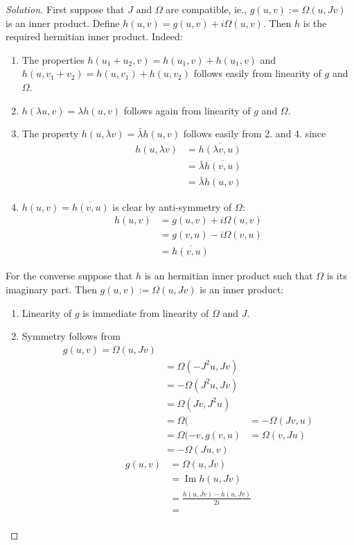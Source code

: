 \begin{proof}[Solution]\leavevmode
	First suppose that $J$ and $\Omega$ are compatible, ie., $g(u,v):=\Omega(u,Jv)$ is an inner product. Define $h(u,v)=g(u,v)+i\Omega(u,v)$. Then  $h$ is the required hermitian inner product. Indeed:

	\begin{enumerate}
		\item The properties $h(u_1+u_2,v)=h(u_1,v)+h(u_1,v)$ and  $h(u,v_1+v_2)=h(u,v_1)+h(u,v_2)$ follows easily from linearity of $g$ and $\Omega$.
		
		\item $h(\lambda u,v)=\lambda h(u,v)$ follows again from linearity of $g$ and $\Omega$.

		\item The property $h(u,\lambda v)=\bar{\lambda} h(u,v)$ follows easily from 2. and 4. since 
			\begin{align*}
				h(u,\lambda v)& =\overline{h(\lambda v, u)}\\
				& =\bar{\lambda} \overline{h(v,u)}\\
				& =\bar{\lambda} h(u,v)
			\end{align*}

		\item $h(u,v)=\overline{h(v,u)}$ is clear by anti-symmetry of $\Omega$:
			\begin{align*}
				h(u,v)& =g(u,v)+i\Omega(u,v)\\
				& =g(v,u)-i\Omega(v,u)\\
				& =\overline{h(v,u)}
			\end{align*}
	\end{enumerate}
	For the converse suppose that $h$ is an hermitian inner product such that $\Omega$ is its imaginary part. Then $g(u,v):=\Omega(u,Jv)$ is an inner product:
	\begin{enumerate}
		\item Linearity of $g$ is immediate from linearity of $\Omega$ and $J$.

		\item Symmetry follows from
			 \begin{align*}
				g(u,v)=\Omega(u,Jv)\\
				&=\Omega(-J^{2} u,Jv)\\
				& =-\Omega(J^{2} u,Jv)\\
				& =\Omega(Jv,J^{2} u)\\
				&=\Omega(
				&=-\Omega(Jv,u)\\
				&=\Omega(-v,
				g(v,u)&=\Omega(v,Ju)\\
				&=-\Omega(Ju,v)
			\end{align*}
			\begin{align*}
				g(u,v)& =\Omega(u,Jv)\\
				& =\operatorname{Im}h(u,Jv)\\
				&=\frac{h(u,Jv)-\overline{h(u,Jv)}}{2i}\\
				&=\frac{}{}


\end{align*}
\end{enumerate}
\end{proof}
